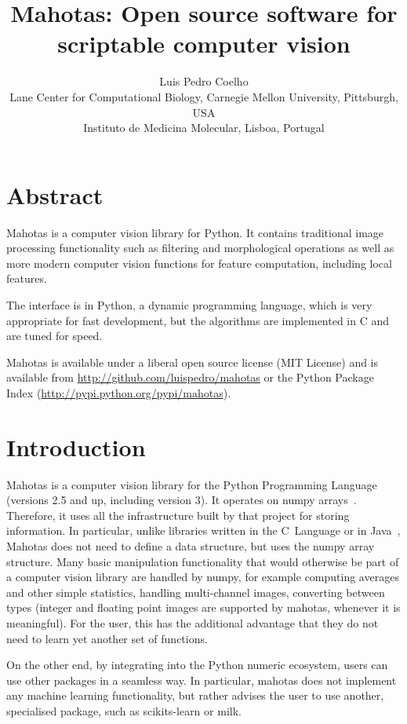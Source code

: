 \documentclass{article}
\title{Mahotas: Open source software for scriptable computer vision}
\author{Luis Pedro Coelho\\
Lane Center for Computational Biology, Carnegie Mellon University, Pittsburgh, USA\\
Instituto de Medicina Molecular, Lisboa, Portugal}
\newcommand*{\cpp}{{C\nolinebreak[4]\hspace{-.05em}\raisebox{.4ex}{\tiny\textbf{++}}}}
\begin{document}
\maketitle

\section*{Abstract}
Mahotas is a computer vision library for Python. It contains traditional image
processing functionality such as filtering and morphological operations as well
as more modern computer vision functions for feature computation, including
local features.

The interface is in Python, a dynamic programming language, which is very
appropriate for fast development, but the algorithms are implemented in \cpp{}
and are tuned for speed.

Mahotas is available under a liberal open source license (MIT License) and is
available from \url{http://github.com/luispedro/mahotas} or the Python Package
Index (\url{http://pypi.python.org/pypi/mahotas}).

\section{Introduction}

Mahotas is a computer vision library for the Python Programming Language
(versions 2.5 and up, including version 3). It operates on numpy
arrays~\citep{numpystructure}. Therefore, it uses all the infrastructure built
by that project for storing information. In particular, unlike libraries
written in the C~Language or in Java~\citep{Marcel:2010:TMP:1873951.1874254},
Mahotas does not need to define a data structure, but uses the numpy array
structure. Many basic manipulation functionality that would otherwise be part
of a computer vision library are handled by numpy, for example computing
averages and other simple statistics, handling multi-channel images, converting
between types (integer and floating point images are supported by mahotas,
whenever it is meaningful). For the user, this has the additional advantage
that they do not need to learn yet another set of functions.

On the other end, by integrating into the Python numeric ecosystem, users can
use other packages in a seamless way. In particular, mahotas does not implement
any machine learning functionality, but rather advises the user to use another,
specialised package, such as scikits-learn or milk.
\end{document}
